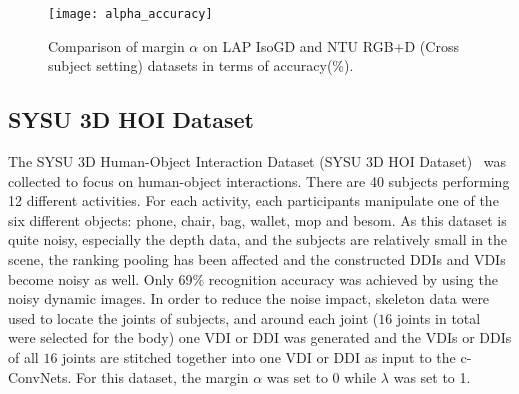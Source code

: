 \documentclass[letterpaper]{article} %
\makeatletter
\newcommand{\tabincell}[2]{\begin{tabular}{@{}#1@{}}#2
\end{tabular}}
\makeatother
\begin{document}

\begin{figure}[t]
\begin{center}{\texttt{[image: alpha\_accuracy]}}
\end{center}
\caption{Comparison of margin $\alpha$ on LAP IsoGD and NTU RGB+D (Cross subject
setting) datasets in terms of accuracy(\%).\label{alpha} }
\end{figure}

\subsection{SYSU 3D HOI Dataset}
The SYSU 3D Human-Object Interaction Dataset (SYSU 3D HOI
Dataset)~\cite{hu2015jointly}  was collected to focus on human-object
interactions. There are 40 subjects performing 12 different activities. For each
activity, each participants manipulate one of the six different objects: phone,
chair, bag, wallet, mop and besom.
As this dataset is quite noisy, especially
the depth data, and the subjects are relatively small in the scene, the ranking pooling has been affected and the constructed DDIs and VDIs become noisy as well. Only 69\% recognition accuracy was achieved by using the noisy dynamic images. In order to reduce the noise impact,
skeleton data were used to locate the joints of subjects,
and around each joint ($16$ joints in total were selected for the body) one VDI or DDI was generated
and the VDIs or DDIs of all $16$ joints are stitched together into one VDI or DDI as input to the c-ConvNets.
For this dataset, the margin $\alpha$ was set to 0 while $\lambda$ was set to 1.
\end{document}
